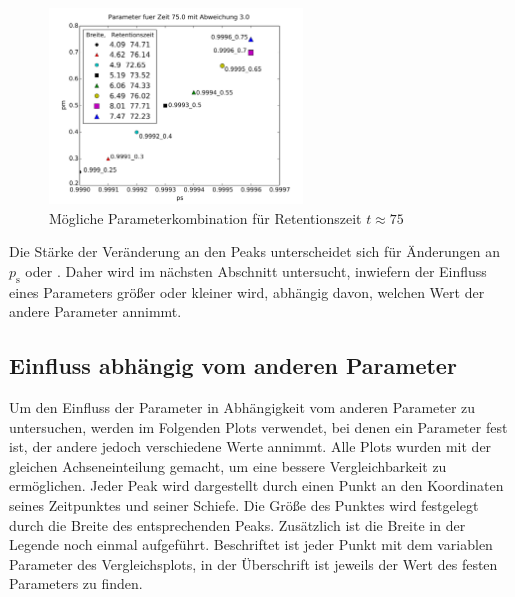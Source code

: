 \begin{figure}[h]
\centering
\includegraphics[width=0.6\textwidth]{bilder/paramsfuert75}
\caption{Mögliche Parameterkombination für Retentionszeit $t \approx 75$}
\label{params_at_time}
\end{figure}

Die Stärke der Veränderung an den Peaks unterscheidet sich für Änderungen an $p_{\text{s}}$ oder \pm. Daher wird im nächsten Abschnitt untersucht, inwiefern der Einfluss eines Parameters größer oder kleiner wird, abhängig davon, welchen Wert der andere Parameter annimmt.

\subsection{Einfluss abhängig vom anderen Parameter}

Um den Einfluss der Parameter in Abhängigkeit vom anderen Parameter zu untersuchen, werden im Folgenden Plots verwendet, bei denen ein Parameter fest ist, der andere jedoch verschiedene Werte annimmt. Alle Plots wurden mit der gleichen Achseneinteilung gemacht, um eine bessere Vergleichbarkeit zu ermöglichen. Jeder Peak wird dargestellt durch einen Punkt an den Koordinaten seines Zeitpunktes und seiner Schiefe. Die Größe des Punktes wird festgelegt durch die Breite des entsprechenden Peaks. Zusätzlich ist die Breite in der Legende noch einmal aufgeführt. Beschriftet ist jeder Punkt mit dem variablen Parameter des Vergleichsplots, in der Überschrift ist jeweils der Wert des festen Parameters zu finden.


